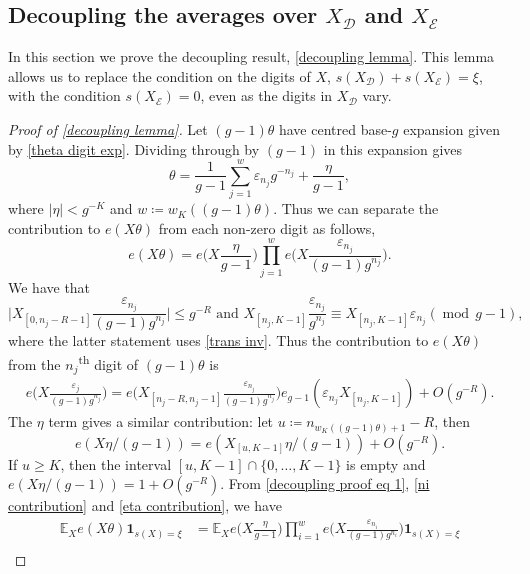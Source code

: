 \documentclass[hidelinks,11pt,reqno]{amsart}
\renewcommand{\leq}{\leqslant}
\renewcommand{\geq}{\geqslant}
\newcommand{\E}{\ensuremath{\mathbb{E}}}
\newcommand{\ind}{\mathbf{1}}
\newcommand{\xb}{X}
\newcommand{\sth}{\textsuperscript{th }}
\newcommand{\xbd}{X_{\mathcal{D}}}
\newcommand{\xbee}{X_{\mathcal{E}}}
\newcommand{\ru}[1]{e_{g-1}(#1)}
\newcommand{\sx}[1]{s(#1)}
\theoremstyle{remark}
\newcommand{\md}[1]{\ensuremath{(\operatorname{mod}\, #1)}}
\begin{document}
\subsection{Decoupling the averages over $\xbd$ and $\xbee$}\label{section decoupling}
In this section we prove the decoupling result, \cref{decoupling lemma}. This lemma allows us to replace the condition on the digits of $X$, $s(\xbd)+s(\xbee)=\xi$, with the condition $s(\xbee)=0$, even as the digits in $\xbd$ vary.
\begin{proof}[Proof of \cref{decoupling lemma}] Let $(g-1)\theta$ have centred base-$g$ expansion given by \cref{theta digit exp}. Dividing through by $(g-1)$ in this expansion gives
\[\theta=\frac{1}{g-1}\sum_{j=1}^{w}\varepsilon_{n_{j}}g^{-n_{j}}+\frac{\eta}{g-1},\]
where $|\eta|<g^{-K}$ and $w\coloneq w_{K}((g-1)\theta)$. Thus we can separate the contribution to $e(\xb\theta)$ from each non-zero digit as follows,
\begin{equation}\label{decoupling proof eq 1}
    e(\xb\theta)=e\Big(\xb\frac{\eta}{g-1}\Big)\prod_{j=1}^{w} e\Big(\xb \frac{\varepsilon_{n_{j}}}{(g-1)g^{n_{j}}}\Big).
\end{equation}
We have that
\[\Big|\xb_{[0,n_{j}-R-1]}\frac{\varepsilon_{n_{j}}}{(g-1)g^{n_{j}}}\Big|\leq g^{-R} \textrm{ and } \xb_{[n_{j},K-1]}\frac{\varepsilon_{n_{j}}}{g^{n_{j}}}\equiv X_{[n_{j},K-1]}\varepsilon_{n_{j}}\md{g-1}, \]
where the latter statement uses \cref{trans inv}. Thus the contribution to $e(X\theta)$ from the $n_{j}$\sth digit of $(g-1)\theta$ is
     \begin{align}
    e\Big(\xb\frac{\varepsilon_{j}}{(g-1)g^{n_{j}}}\Big)=e\Big(\xb_{[n_{j}-R,n_{j}-1]}\frac{\varepsilon_{n_{j}}}{(g-1)g^{n_{j}}}\Big )\ru{\varepsilon_{n_{j}}\xb_{[n_{j},K-1]}}+O(g^{-R})\label{ni contribution}.
    \end{align}
The $\eta$ term gives a similar contribution: let $u\coloneq n_{w_{K}((g-1)\theta)+1}-R$, then
    \begin{equation}\label{eta contribution}
        e(\xb\eta/(g-1))=e(\xb_{[u,K-1]}\eta/(g-1))+O(g^{-R}).
    \end{equation}
    If $u\geq K$, then the interval $[u,K-1]\cap \{0,\ldots, K-1\}$ is empty and $e(X\eta/(g-1))=1+O(g^{-R})$. From \cref{decoupling proof eq 1}, \cref{ni contribution} and \cref{eta contribution}, we have
\begin{align}
    \E_{\xb}e(\xb\theta)\ind_{\sx{\xb}=\xi}&=\E_{\xb}e\Big(\xb\frac{\eta}{g-1}\Big)\prod_{i=1}^{w}e\Big (\xb\frac{\varepsilon_{n_{i}}}{(g-1)g^{n_{i}}}\Big)\ind_{\sx{\xb}=\xi}\nonumber\\

\end{align}
\end{proof}
\end{document}
